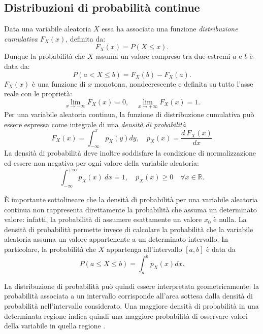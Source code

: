 \subsection{Distribuzioni di probabilità continue}

Data una variabile aleatoria $X$ essa ha associata una funzione \emph{distribuzione cumulativa} $F_X(x)$, definita da: 
\begin{equation}
    F_X(x) = P(X \leq x).
\end{equation}
Dunque la probabilità che $X$ assuma un valore compreso tra due estremi $a$ e $b$ è data da:
\begin{equation}
    P (a < X \le b) = F_X(b) - F_X(a).
\end{equation}
$F_X(x)$ è una funzione di $x$ monotona, nondecrescente e definita su tutto l'asse reale con le proprietà: 
\begin{equation}
    \lim_{x \to - \infty }F_X(x) = 0, \quad  \lim_{x \to + \infty }F_X(x) = 1.
\end{equation} 
Per una variabile aleatoria continua, la funzione di distribuzione cumulativa può essere espressa come integrale di una \emph{densità di probabilità}
\begin{equation}
    F_X(x) = \int_{- \infty}^{x} p_X(y) dy,  \quad p_X(x) = \frac{d\ F_X(x)}{dx}
\end{equation}
La densità di probabilità deve inoltre soddisfare la condizione di normalizzazione ed essere non negativa per ogni valore della variabile aleatoria:
\begin{equation}
\int_{-\infty}^{+\infty}p_X(x) \ dx=1, \quad
p_X(x) \geq 0 \quad \forall x \in \mathbb{R}.
\end{equation}

È importante sottolineare che la densità di probabilità per una variabile aleatoria continua non rappresenta direttamente la probabilità che assuma un determinato valore: infatti, la probabilità di assumere esattamente un valore $x_0$
è nulla. La densità di probabilità permette invece di calcolare la probabilità che la variabile aleatoria assuma un valore appartenente a un determinato intervallo. In particolare, la probabilità che $X$ appartenga all'intervallo $[a,b]$ è data da
\begin{equation}
P(a\leq X\leq b) = \int_a^b p_X(x) dx.
\end{equation}

La distribuzione di probabilità può quindi essere interpretata geometricamente: la probabilità associata a un intervallo corrisponde all'area sottesa dalla densità di probabilità nell'intervallo considerato. Una maggiore densità di probabilità in una determinata regione indica quindi una maggiore probabilità di osservare valori della variabile in quella regione \cite{budd2025monte}.

